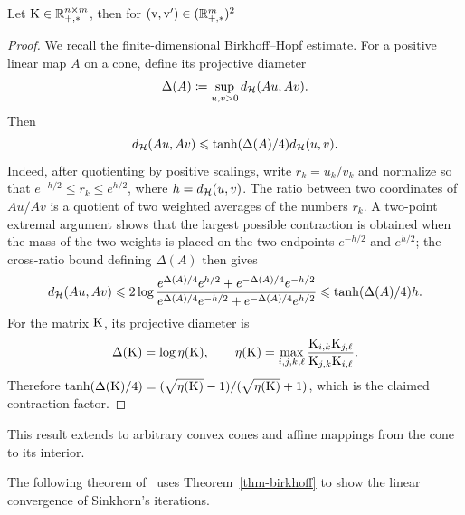 \begin{thm}\label{thm-birkhoff}
	Let $\mathrm{K} \in \mathbb{R}_{+,*}^{n \times m}$, then for $(\mathrm{v},\mathrm{v}') \in (\mathbb{R}_{+,*}^m)^2$
\end{thm}
\begin{proof}
	We recall the finite-dimensional Birkhoff--Hopf estimate. For a positive linear map $A$ on a cone, define its projective diameter
	\[
		\Delta(A) \coloneqq \sup_{u,v>0} d_{\mathcal{H}}(Au,Av).
	\]
	Then
	\[
		d_{\mathcal{H}}(Au,Av) \leqslant \tanh(\Delta(A)/4)d_{\mathcal{H}}(u,v).
	\]
	Indeed, after quotienting by positive scalings, write $r_k=u_k/v_k$ and normalize so that $e^{-h/2}\leq r_k\leq e^{h/2}$, where $h=d_{\mathcal{H}}(u,v)$. The ratio between two coordinates of $Au/Av$ is a quotient of two weighted averages of the numbers $r_k$. A two-point extremal argument shows that the largest possible contraction is obtained when the mass of the two weights is placed on the two endpoints $e^{-h/2}$ and $e^{h/2}$; the cross-ratio bound defining $\Delta(A)$ then gives
	\[
		d_{\mathcal{H}}(Au,Av)
		\leqslant
		2\log\frac{e^{\Delta(A)/4}e^{h/2}+e^{-\Delta(A)/4}e^{-h/2}}
		{e^{\Delta(A)/4}e^{-h/2}+e^{-\Delta(A)/4}e^{h/2}}
		\leqslant \tanh(\Delta(A)/4)h.
	\]
	For the matrix $\mathrm{K}$, its projective diameter is
	\[
		\Delta(\mathrm{K})=\log \eta(\mathrm{K}),
		\qquad
		\eta(\mathrm{K})=\max_{i,j,k,\ell}
		\frac{\mathrm{K}_{i,k}\mathrm{K}_{j,\ell}}{\mathrm{K}_{j,k}\mathrm{K}_{i,\ell}}.
	\]
	Therefore $\tanh(\Delta(\mathrm{K})/4)=(\sqrt{\eta(\mathrm{K})}-1)/(\sqrt{\eta(\mathrm{K})}+1)$, which is the claimed contraction factor.
\end{proof}

This result extends to arbitrary convex cones and affine mappings from the cone to its interior.

The following theorem of~\cite{franklin1989scaling} uses Theorem~\ref{thm-birkhoff} to show the linear convergence of Sinkhorn's iterations.

